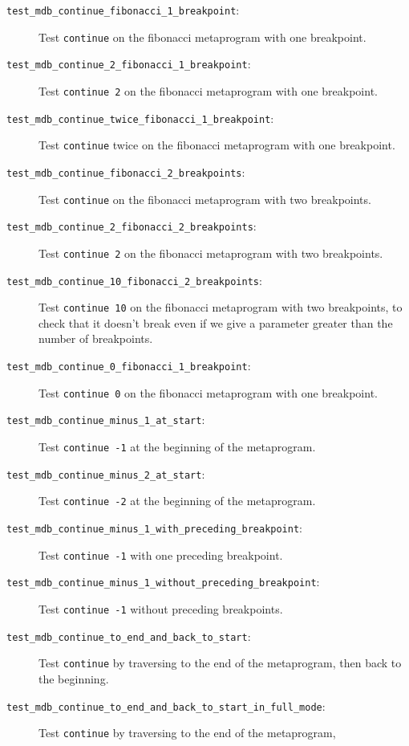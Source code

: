 \begin{description}
    \item[\texttt{test\_mdb\_continue\_fibonacci\_1\_breakpoint}:]
        Test \texttt{continue} on the fibonacci metaprogram with one
        breakpoint.
    \item[\texttt{test\_mdb\_continue\_2\_fibonacci\_1\_breakpoint}:]
        Test \texttt{continue 2} on the fibonacci metaprogram with one
        breakpoint.
    \item[\texttt{test\_mdb\_continue\_twice\_fibonacci\_1\_breakpoint}:]
        Test \texttt{continue} twice on the fibonacci metaprogram with one
        breakpoint.
    \item[\texttt{test\_mdb\_continue\_fibonacci\_2\_breakpoints}:]
        Test \texttt{continue} on the fibonacci metaprogram with two
        breakpoints.
    \item[\texttt{test\_mdb\_continue\_2\_fibonacci\_2\_breakpoints}:]
        Test \texttt{continue 2} on the fibonacci metaprogram with two
        breakpoints.
    \item[\texttt{test\_mdb\_continue\_10\_fibonacci\_2\_breakpoints}:]
        Test \texttt{continue 10} on the fibonacci metaprogram with two
        breakpoints, to check that it doesn't break even if we give a
        parameter greater than the number of breakpoints.
    \item[\texttt{test\_mdb\_continue\_0\_fibonacci\_1\_breakpoint}:]
        Test \texttt{continue 0} on the fibonacci metaprogram with one
        breakpoint.
    \item[\texttt{test\_mdb\_continue\_minus\_1\_at\_start}:]
        Test \texttt{continue -1} at the beginning of the metaprogram.
    \item[\texttt{test\_mdb\_continue\_minus\_2\_at\_start}:]
        Test \texttt{continue -2} at the beginning of the metaprogram.
    \item[\texttt{test\_mdb\_continue\_minus\_1\_with\_preceding\_breakpoint}:]
        Test \texttt{continue -1} with one preceding breakpoint.
    \item[\texttt{test\_mdb\_continue\_minus\_1\_without\_preceding\_breakpoint}:]
        Test \texttt{continue -1} without preceding breakpoints.
    \item[\texttt{test\_mdb\_continue\_to\_end\_and\_back\_to\_start}:]
        Test \texttt{continue} by traversing to the end of the metaprogram,
        then back to the beginning.
    \item[\texttt{test\_mdb\_continue\_to\_end\_and\_back\_to\_start\_in\_full\_mode}:]
        Test \texttt{continue} by traversing to the end of the metaprogram,

\end{description}
